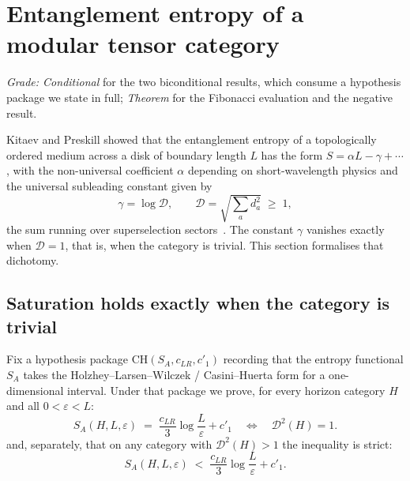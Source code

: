 \documentclass[aps,prx,nofootinbib,superscriptaddress,12pt]{revtex4-2}
\begin{document}

\section{Entanglement entropy of a modular tensor category}
\label{sec:entropy}

\emph{Grade: Conditional} for the two biconditional results, which
consume a hypothesis package we state in full; \emph{Theorem} for the
Fibonacci evaluation and the negative result.

Kitaev and Preskill showed that the entanglement entropy of a
topologically ordered medium across a disk of boundary length $L$ has the
form $S = \alpha L - \gamma + \cdots$, with the non-universal coefficient
$\alpha$ depending on short-wavelength physics and the universal
subleading constant given by
\begin{equation}
\gamma = \log \mathcal{D},
\qquad
\mathcal{D} = \sqrt{\textstyle\sum_a d_a^2} \;\ge\; 1 ,
\label{eq:kp}
\end{equation}
the sum running over superselection sectors~\cite{KitaevPreskill2006}.
The constant $\gamma$ vanishes exactly when $\mathcal{D} = 1$, that is,
when the category is trivial. This section formalises that dichotomy.

\subsection{Saturation holds exactly when the category is trivial}

Fix a hypothesis package $\mathrm{CH}(S_A, c_{LR}, c'_1)$ recording that
the entropy functional $S_A$ takes the Holzhey--Larsen--Wilczek /
Casini--Huerta form for a one-dimensional interval. Under that package we
prove, for every horizon category $H$ and all $0 < \varepsilon < L$:
\begin{equation}
S_A(H, L, \varepsilon)
 \;=\; \frac{c_{LR}}{3}\log\frac{L}{\varepsilon} + c'_1
\quad\Longleftrightarrow\quad
\mathcal{D}^2(H) = 1 .
\label{eq:chsat}
\end{equation}
and, separately, that on any category with $\mathcal{D}^2(H) > 1$ the
inequality is strict:
\begin{equation}
S_A(H, L, \varepsilon)
 \;<\; \frac{c_{LR}}{3}\log\frac{L}{\varepsilon} + c'_1 .
\label{eq:chstrict}
\end{equation}
\end{document}
